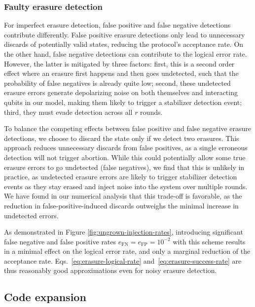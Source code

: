 \documentclass[twocolumn,
notitlepage,
aps,
prx,
floatfix,
superscriptaddress
]{revtex4-2}
\begin{document}
\subsubsection{Faulty erasure detection}

For imperfect erasure detection, false positive and false negative detections contribute differently.
False positive erasure detections only lead to unnecessary discards of potentially valid states, reducing the protocol's acceptance rate. 
On the other hand, false negative detections can contribute to the logical error rate. However, the latter is mitigated by three factors: first, this is a second order effect where an erasure first happens and then goes undetected, such that the probability of false negatives is already quite low; second, these undetected erasure errors generate depolarizing noise on both themselves and interacting qubits in our model, making them likely to trigger a stabilizer detection event; third, they must evade detection across all $r$ rounds.


To balance the competing effects between false positive and false negative erasure detections, we choose to discard the state only if we detect two erasures. This approach reduces unnecessary discards from false positives, as a single erroneous detection will not trigger abortion. While this could potentially allow some true erasure errors to go undetected (false negatives), we find that this is unlikely in practice, as undetected erasure errors are likely to trigger stabilizer detection events as they stay erased and inject noise into the system over multiple rounds.
We have found in our numerical analysis that this trade-off is favorable, as the reduction in false-positive-induced discards outweighs the minimal increase in undetected errors.

As demonstrated in Figure \ref{fig:ungrown-injection-rates}, introducing significant false negative and false positive rates $e_\text{FN}=e_\text{FP}=10^{-2}$ with this scheme results in a minimal effect on the logical error rate, and only a marginal reduction of the acceptance rate. Eqs.~\eqref{eq:erasure-logical-rate} and~\eqref{eq:erasure-success-rate} are thus reasonably good approximations even for noisy erasure detection.


\subsection{Code expansion} \label{sec: expanding-the-state}
\end{document}
